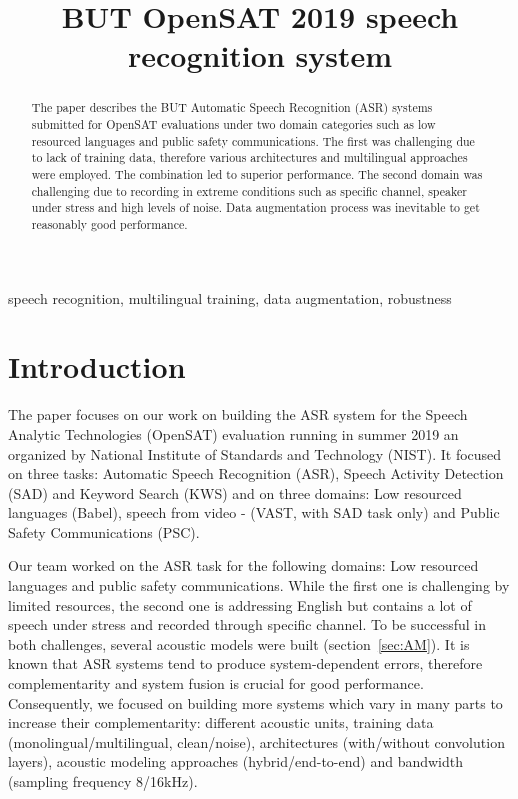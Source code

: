 \documentclass{article}
\title{BUT OpenSAT 2019 speech recognition system}
\begin{document}
\ninept
%
\maketitle
%
\begin{abstract}
The paper describes the BUT Automatic Speech Recognition (ASR) systems submitted for OpenSAT evaluations under two domain categories such as low resourced languages and public safety communications. The first was challenging due to lack of training data, therefore various architectures and multilingual approaches were employed. The combination led to superior performance. The second domain was challenging due to recording in extreme
conditions such as specific channel, speaker under stress and high levels of noise. Data augmentation process was inevitable to get reasonably good performance.
\end{abstract}
%
\begin{keywords}
speech recognition, multilingual
training, data augmentation, robustness
\end{keywords}
%


\section{Introduction}
\label{sec:intro}

The paper focuses on our work on building the ASR system for the
Speech Analytic Technologies (OpenSAT) evaluation running  in summer
2019 an organized by National Institute of Standards and Technology (NIST). It focused on three tasks:
 Automatic Speech Recognition (ASR),  Speech Activity Detection (SAD) and Keyword Search (KWS)
and on three domains:
Low resourced languages (Babel), speech from video - (VAST, with  SAD task only) and Public Safety Communications (PSC).  

Our team worked on the ASR task for the following domains: Low resourced languages and public safety communications.
While the  first one is challenging by limited resources, the second one is addressing English but contains a lot of speech under stress 
and recorded through specific channel. To be successful in both challenges, several  acoustic
models were built (section~\ref{sec:AM}). 
It is known that ASR systems tend to produce system-dependent errors,
therefore complementarity and system fusion is crucial for good performance. 
Consequently, we focused on building more systems which vary in many
parts to increase their complementarity: different acoustic units,
training data (monolingual/multilingual, clean/noise), architectures
(with/without convolution layers), acoustic modeling approaches
(hybrid/end-to-end) and bandwidth (sampling frequency 8/16kHz).
\end{document}
